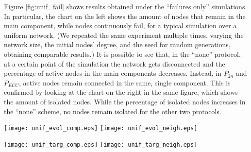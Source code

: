 \documentclass[10pt, conference, compsocconf]{IEEEtran}
\begin{document}
Figure \ref{fig:unif_fail} shows results obtained under the ``failures only'' simulations. In particular, the chart on the left shows the amount of nodes that remain in the main component, while nodes continuously fail, for a typical simulation over a uniform network. (We repeated the same experiment multiple times, varying the network size, the initial nodes' degree, and the seed for random generations, obtaining comparable results.)
It is possible to see that, in the ``none'' protocol, at a certain point of the simulation the network gets disconnected and the percentage of active nodes in the main components decreases. Instead, in $P_{2n}$ and $P_{ECC}$, active nodes remain connected in the same, single component. 
This is confirmed by looking at the chart on the right in the same figure, which shows the amount of isolated nodes. While the percentage of isolated nodes increases in the ``none'' scheme, no nodes remain isolated for the other two protocols.

\begin{figure*}[t]
   \centering
   \texttt{[image: unif\_evol\_comp.eps]}
   \texttt{[image: unif\_evol\_neigh.eps]}
   \caption{Uniform networks: average size of the main components, average amount of $1$st neighbors (referred as ``n1'') and $2$nd neighbors (referred as ``n2''), during the evolution of the network.}
   \label{fig:unif_evol}
\end{figure*}

\begin{figure*}[t]
   \centering
   \texttt{[image: unif\_targ\_comp.eps]}
   \texttt{[image: unif\_targ\_neigh.eps]}
   \caption{Uniform networks: average size of the main components, average amount of $1$st neighbors (referred as ``n1'') and $2$nd neighbors (referred as ``n2''), under a targeted attack.}
   \label{fig:unif_targ}
\end{figure*}

\begin{figure*}[t]
   \centering
      \hspace{1.5cm}
   \caption{Uniform networks -- progressive node failures: Amount of nodes in the main component, isolated nodes.}
   \label{fig:unif_fail}
\end{figure*}
\end{document}
